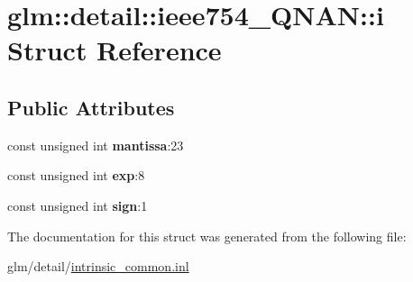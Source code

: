 \hypertarget{structglm_1_1detail_1_1ieee754__QNAN_1_1i}{\section{glm\-:\-:detail\-:\-:ieee754\-\_\-\-Q\-N\-A\-N\-:\-:i Struct Reference}
\label{structglm_1_1detail_1_1ieee754__QNAN_1_1i}
}
\subsection*{Public Attributes}
\begin{DoxyCompactItemize}
\item 
\hypertarget{structglm_1_1detail_1_1ieee754__QNAN_1_1i_a1999926defcba631a716bee7d3044d0a}{const unsigned int {\bfseries mantissa}\-:23}\label{structglm_1_1detail_1_1ieee754__QNAN_1_1i_a1999926defcba631a716bee7d3044d0a}

\item 
\hypertarget{structglm_1_1detail_1_1ieee754__QNAN_1_1i_abc8cdb38ff3aa6a09214f7bfa32efac8}{const unsigned int {\bfseries exp}\-:8}\label{structglm_1_1detail_1_1ieee754__QNAN_1_1i_abc8cdb38ff3aa6a09214f7bfa32efac8}

\item 
\hypertarget{structglm_1_1detail_1_1ieee754__QNAN_1_1i_a5dd7e174864b6a8cd045563dde44f305}{const unsigned int {\bfseries sign}\-:1}\label{structglm_1_1detail_1_1ieee754__QNAN_1_1i_a5dd7e174864b6a8cd045563dde44f305}

\end{DoxyCompactItemize}


The documentation for this struct was generated from the following file\-:\begin{DoxyCompactItemize}
\item 
glm/detail/\hyperlink{intrinsic__common_8inl}{intrinsic\-\_\-common.\-inl}\end{DoxyCompactItemize}
